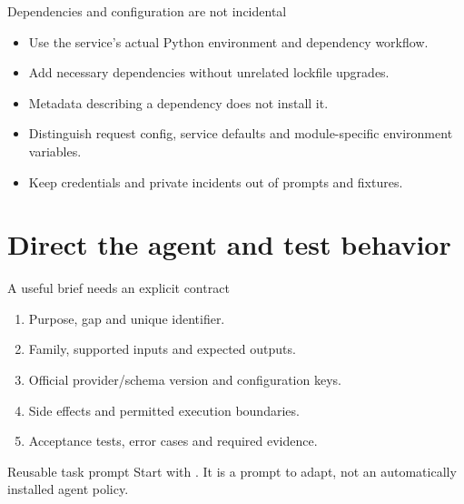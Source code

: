 \begin{frame}{Dependencies and configuration are not incidental}
    \begin{itemize}
        \item Use the service's actual Python environment and dependency workflow.
        \item Add necessary dependencies without unrelated lockfile upgrades.
        \item Metadata describing a dependency does not install it.
        \item Distinguish request config, service defaults and module-specific
        environment variables.
        \item Keep credentials and private incidents out of prompts and fixtures.
    \end{itemize}
\end{frame}

\section{Direct the agent and test behavior}

\begin{frame}{A useful brief needs an explicit contract}
    \begin{enumerate}
        \item Purpose, gap and unique identifier.
        \item Family, supported inputs and expected outputs.
        \item Official provider/schema version and configuration keys.
        \item Side effects and permitted execution boundaries.
        \item Acceptance tests, error cases and required evidence.
    \end{enumerate}
    \begin{block}{Reusable task prompt}
        Start with .
        It is a prompt to adapt, not an automatically installed agent policy.
    \end{block}
\end{frame}

